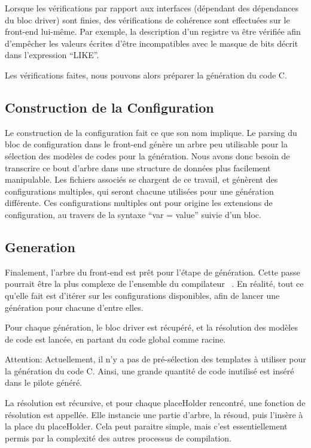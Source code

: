 \documentclass[french]{rtxreport}
\begin{document}
Lorsque les vérifications par rapport aux interfaces (dépendant des dépendances
du bloc driver) sont finies, des vérifications de cohérence sont effectuées sur
le front-end lui-même. Par exemple, la description d'un registre va être
vérifiée afin d'empêcher les valeurs écrites d'être incompatibles avec le
masque de bits décrit dans l'expression ``LIKE''.

Les vérifications faites, nous pouvons alors préparer la génération du code C.

\subsection{Construction de la Configuration}

Le construction de la configuration fait ce que son nom implique. Le parsing du
bloc de configuration dans le front-end génère un arbre peu utilisable pour la
sélection des modèles de codes pour la génération. Nous avons donc besoin de
transcrire ce bout d'arbre dans une structure de données plus facilement
manipulable. Les fichiers associés se chargent de ce travail, et génèrent
des configurations multiples, qui seront chacune utilisées pour une génération
différente. Ces configurations multiples ont pour origine les extensions de
configuration, au travers de la syntaxe ``var = value'' suivie d'un bloc.

\subsection{Generation}

Finalement, l'arbre du front-end est prêt pour l'étape de génération. Cette
passe pourrait être la plus complexe de l'ensemble du compilateur \rtx\ .
En réalité, tout ce qu'elle fait est d'itérer sur les configurations
disponibles, afin de lancer une génération pour chacune d'entre elles.

Pour chaque génération, le bloc driver est récupéré, et la résolution des
modèles de code est lancée, en partant du code global comme racine.

Attention: Actuellement, il n'y a pas de pré-sélection des templates à
utiliser pour la génération du code C. Ainsi, une grande quantité de code
inutilisé est inséré dans le pilote généré.


La résolution est récursive, et pour chaque placeHolder rencontré, une fonction
de résolution est appellée. Elle instancie une partie d'arbre, la résoud, puis
l'insère à la place du placeHolder. Cela peut paraitre simple, mais c'est
essentiellement permis par la complexité des autres processus de compilation.

\end{document}
